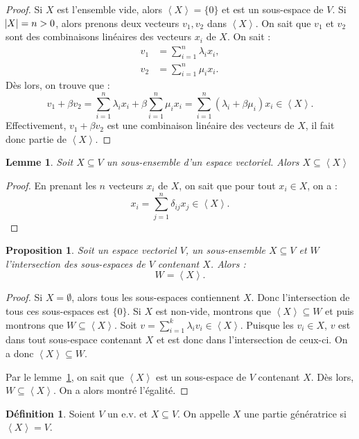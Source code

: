 \documentclass{article}
\newcommand{\eng}[1]{\left\langle#1\right\rangle}
\newtheorem{prp}[thm]{Proposition}
\newtheorem{lem}[thm]{Lemme}
\theoremstyle{definition}
\newtheorem{déf}[thm]{Définition}
\theoremstyle{remark}
\begin{document}
		\begin{proof} Si $X$ est l'ensemble vide, alors $\eng X = \{0\}$ et est un sous-espace de $V$. Si $\abs X = n > 0$, alors prenons deux vecteurs $v_1, v_2$ dans
		$\eng X$. On sait que $v_1$ et $v_2$ sont des combinaisons linéaires des vecteurs $x_i$ de $X$. On sait :
		\begin{align*}
			v_1 &= \sum_{i=1}^n\lambda_ix_i, \\
			v_2 &= \sum_{i=1}^n\mu_ix_i.
		\end{align*}
		Dès lors, on trouve que : \[v_1 + \beta v_2 = \sum_{i=1}^n\lambda_ix_i + \beta\sum_{i=1}^n\mu_ix_i = \sum_{i=1}^n(\lambda_i + \beta\mu_i)x_i \in \eng X.\] Effectivement,
		$v_1 + \beta v_2$ est une combinaison linéaire des vecteurs de $X$, il fait donc partie de $\eng X$. \end{proof}

		\begin{lem}\label{X<<X>} Soit $X \subseteq V$ un sous-ensemble d'un espace vectoriel. Alors $X \subseteq \eng X$ \end{lem}

		\begin{proof} En prenant les $n$ vecteurs $x_i$ de $X$, on sait que pour tout $x_i \in X$, on a :\[x_i = \sum_{j=1}^n\delta_{ij}x_j \in \eng X.\] \end{proof}

		\begin{prp} Soit un espace vectoriel $V$, un sous-ensemble $X \subseteq V$ et $W$ l'intersection des sous-espaces de $V$ contenant $X$. Alors : \[W = \eng X.\]
		\end{prp}

		\begin{proof} Si $X = \emptyset$, alors tous les sous-espaces contiennent $X$. Donc l'intersection de tous ces sous-espaces est $\{0\}$. Si $X$ est non-vide, montrons
		que $\eng X \subseteq W$ et puis montrons que $W \subseteq \eng X$. Soit $v = \sum_{i=1}^k\lambda_iv_i \in \eng X$. Puisque les $v_i \in X$, $v$ est dans tout
		sous-espace contenant $X$ et est donc dans l'intersection de ceux-ci. On a donc $\eng X \subseteq W$.

		Par le lemme~\ref{X<<X>}, on sait que $\eng X$ est un sous-espace de $V$ contenant $X$. Dès lors, $W \subseteq \eng X$. On a alors montré l'égalité. \end{proof}

		\begin{déf} Soient $V$ un e.v. et $X \subseteq V$. On appelle $X$ une partie génératrice si $\eng X = V$. \end{déf}
\end{document}
